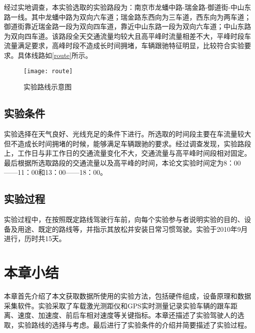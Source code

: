 经过实地调查，本实验选取的实验路段为：南京市龙蟠中路-瑞金路-御道街-中山东路一线。其中龙蟠中路为双向六车道；瑞金路东西向为三车道，西东向为两车道；御道街靠近瑞金路一段为双向四车道，靠近中山东路一段为双向六车道；中山东路为双向四车道。该路段全天交通流量均较大且高平峰时流量相差不大，平峰时段车流量满足要求，高峰时段不造成长时间拥堵，车辆跟驰特征明显，比较符合实验要求。具体线路如\autoref{route}所示。

\begin{figure}[htpb]
	\centering
	\texttt{[image: route]}
	\caption{实验路线示意图}
	\label{route}
\end{figure}

\subsection{实验条件}
实验选择在天气良好、光线充足的条件下进行。所选取的时间段主要在车流量较大但不造成长时间拥堵的时候，能够满足车辆跟驰的要求。经过调查发现，实验路段上，工作日与非工作日的交通流量变化不大，交通流量与高平峰时间段相对固定。最后根据所选取路段的交通流量以及高平峰的时间，本论文实验时间定为8：00——11：00和13：00——18：00。
\subsection{实验过程}
实验过程中，在按照既定路线驾驶行车前，向每个实验参与者说明实验的目的、设备及用途、既定的路线等，并指示其放松并安装日常习惯驾驶。实验于2010年9月进行，历时共15天。



\section{本章小结}
本章首先介绍了本文获取数据所使用的实验方法，包括硬件组成，设备原理和数据采集软件。实验采取了车载激光测距仪和GPS实时测量记录实验车辆的跟车距离、速度、加速度、前后车相对速度等关键指标。本章还描述了实验驾驶人的选取，实验路线的选择与考虑。最后进行了实验条件的介绍并简要描述了实验过程。















